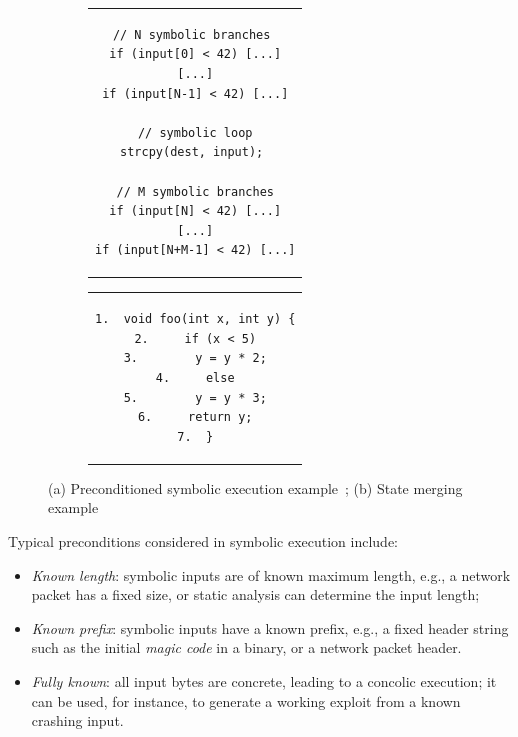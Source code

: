 \begin{figure}[t]
\centering
\begin{subfigure}[t]{.4\textwidth}
\begin{tabular}{c}
\begin{lstlisting}[basicstyle=\ttfamily\scriptsize]
// N symbolic branches 
if (input[0] < 42) [...]
[...]
if (input[N-1] < 42) [...]

// symbolic loop
strcpy(dest, input); 

// M symbolic branches
if (input[N] < 42) [...]
[...]
if (input[N+M-1] < 42) [...]
\end{lstlisting}
\end{tabular}
\caption{\label{fig:preconditioned}}
\end{subfigure}
\begin{subfigure}[t]{.4\textwidth}
\begin{tabular}{c}
\lstset{
   showlines=true
}
\begin{lstlisting}[basicstyle=\ttfamily\scriptsize]
1.  void foo(int x, int y) {
2.     if (x < 5)
3.        y = y * 2;
4.     else
5.        y = y * 3;
6.     return y;
7.  }

\end{lstlisting}
\end{tabular}
\caption{\label{fi:example-state-merging} }
\end{subfigure}
\caption{\label{fig:preconditioned-and-merge} (a) Preconditioned symbolic execution example~\protect\cite{AEG-NDSS11}; (b) State merging example}
\end{figure}

\noindent Typical preconditions considered in symbolic execution include:
\begin{itemize}
\item {\em Known length}: symbolic inputs are of known maximum length, e.g., a network packet has a fixed size, or static analysis can determine the input length;
\item {\em Known prefix}: symbolic inputs have a known prefix, e.g., a fixed header string such as the initial {\em magic code} in a binary, or a network packet header.
\item {\em Fully known}: all input bytes are concrete, leading to a concolic execution; it can be used, for instance, to generate a working exploit from a known crashing input. 
\end{itemize}

